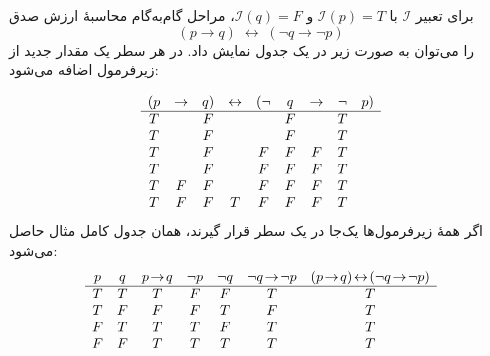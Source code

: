     \begin{example}[مثال \lr{2.23}]
      برای تعبیر \(\mathscr{I}\) با \(\mathscr{I}(p)=T\) و \(\mathscr{I}(q)=F\)، مراحل گام‌به‌گام محاسبهٔ ارزش صدق
      \[
      (p\to q)\;\leftrightarrow\;(\neg q\to\neg p)
      \]
      را می‌توان به صورت زیر در یک جدول نمایش داد. در هر سطر یک مقدار جدید از زیرفرمول اضافه می‌شود:
      
      \[
      \begin{array}{c c c c c c c c c}
      (p & \rightarrow & q) & \leftrightarrow & (\neg & q & \rightarrow & \neg & p)\\
      \hline
      T &   & F &     &     & F   &    &  T  \\
      T &   & F &     &     & F   &    &  T  \\
      T &   & F &     & F   & F   & F  &  T  \\
      T &   & F &     & F   & F   & F  &  T  \\
      T & F & F &     & F   & F   & F  &  T  \\
      T & F & F & T   & F   & F   & F  &  T  \\
      \end{array}
      \]
      اگر همهٔ زیرفرمول‌ها یک‌جا در یک سطر قرار گیرند، همان جدول کامل مثال  حاصل می‌شود:
      \[
      \begin{array}{c c c c c c c}
      p & q & p\!\to\!q & \neg p & \neg q & \neg q\!\to\!\neg p & (p\!\to\!q)\!\leftrightarrow\!(\neg q\!\to\!\neg p)\\
      \hline
      T & T & T & F & F & T & T\\
      T & F & F & F & T & F & T\\
      F & T & T & T & F & T & T\\
      F & F & T & T & T & T & T
      \end{array}
      \]
    \end{example}